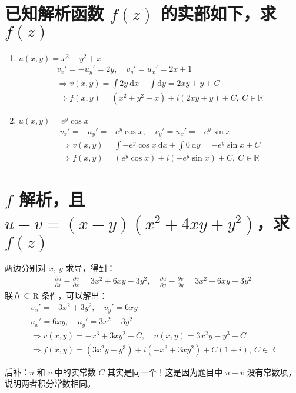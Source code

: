 \documentclass[UTF8]{report}
\def\R{\mathbb{R}}
\theoremstyle{MyLineTheoremStyle} %
\theoremstyle{MyBlockTheoremStyle} %
\theoremstyle{MySubsubsectionStyle} %
\begin{document}
\section{已知解析函数 $f(z)$ 的实部如下，求 $f(z)$}
\begin{enumerate}
\item $u(x,y) = x^2-y^2 + x$
\begin{gather*}
v_x' = -u_y' = 2y,\quad v_y' = u_x' = 2x + 1\\ 
\Longrightarrow 
v(x,y) = \int 2y \ \mathrm{d}x + \int \mathrm{d}y = 2xy + y + C \\ 
\Longrightarrow f(x,y)= (x^2 + y^2 + x )+ i(2xy + y) + C,\ C \in \R
\end{gather*}

\item $u(x,y) = e^y\cos x$
\begin{gather*}
v_x' = -u_y' = -e^y\cos x,\quad v_y' = u_x' = -e^y\sin x\\ 
\Longrightarrow
v(x,y) = \int -e^y\cos x\  \mathrm{d}x + \int 0\ \mathrm{d}y = - e^y\sin x  + C \\ 
\Longrightarrow f(x,y) = (e^y\cos x) + i(-e^y\sin x ) + C ,\ C \in \R
\end{gather*}
\end{enumerate}


\section{$f$ 解析，且 $u - v = (x-y)(x^2 + 4xy + y^2)$，求 $f(z)$}
两边分别对 $x,\ y$ 求导，得到：
\begin{gather*}
\frac{\partial u }{\partial x } - \frac{\partial v }{\partial x }  = 3x^2 + 6xy -3y^2, \quad 
\frac{\partial u }{\partial y } - \frac{\partial v }{\partial y } = 3x^2 - 6xy -3y^2
\end{gather*}
联立 C-R 条件，可以解出：
\begin{gather*}
v_x' = -3x^2 + 3y^2, \quad v_y' = 6xy \\ 
u_x' = 6xy,\quad u_y' = 3x^2 - 3y^2 \\ 
\Longrightarrow v(x,y) = -x^3 + 3xy^2 + C, \quad u(x,y) = 3x^2y - y^3 + C \\ 
\Longrightarrow f(x,y) = (3x^2y - y^3) + i(-x^3 + 3xy^2) + C(1+i),\ C \in \R
\end{gather*}

{\par\color{gray}\small
后补：$u$ 和 $v$ 中的实常数 $C$ 其实是同一个！这是因为题目中 $u-v$ 没有常数项，说明两者积分常数相同。
\par}
\end{document}
